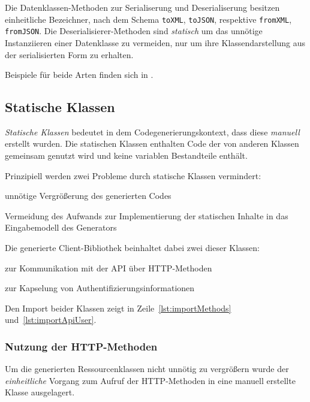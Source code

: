Die Datenklassen-Methoden zur Serialiserung und Deserialiserung besitzen einheitliche Bezeichner, nach dem Schema \texttt{toXML}, \texttt{toJSON}, respektive \texttt{fromXML}, \texttt{fromJSON}. Die Deserialisierer-Methoden sind \emph{statisch} um das unnötige Instanziieren einer Datenklasse zu vermeiden, nur um ihre Klassendarstellung aus der serialisierten Form zu erhalten.

Beispiele für beide Arten finden sich in .

\subsection{Statische Klassen}
\label{sec:static_classes}

\emph{Statische Klassen} bedeutet in dem Codegenerierungskontext, dass diese \emph{manuell} erstellt wurden. Die statischen Klassen enthalten Code der von anderen Klassen gemeinsam genutzt wird und keine variablen Bestandteile enthält. 

Prinzipiell werden zwei Probleme durch statische Klassen vermindert:
\begin{compactenum}
  \item unnötige Vergrößerung des generierten Codes
  \item Vermeidung des Aufwands zur Implementierung der statischen Inhalte in das Eingabemodell des Generators
\end{compactenum}

Die generierte Client-Bibliothek beinhaltet dabei zwei dieser Klassen:
\begin{compactenum}
  \item zur Kommunikation mit der \gls{API} über \gls{HTTP}-Methoden
  \item zur Kapselung von Authentifizierungsinformationen
\end{compactenum}

Den Import beider Klassen zeigt  in Zeile~\ref{lst:importMethods} und~\ref{lst:importApiUser}.

\subsubsection{Nutzung der HTTP-Methoden}
\label{sec:staticMethodsClass}

Um die generierten Ressourcenklassen nicht unnötig zu vergrößern wurde der \emph{einheitliche} Vorgang zum Aufruf der \gls{HTTP}-Methoden in eine manuell erstellte Klasse ausgelagert.

